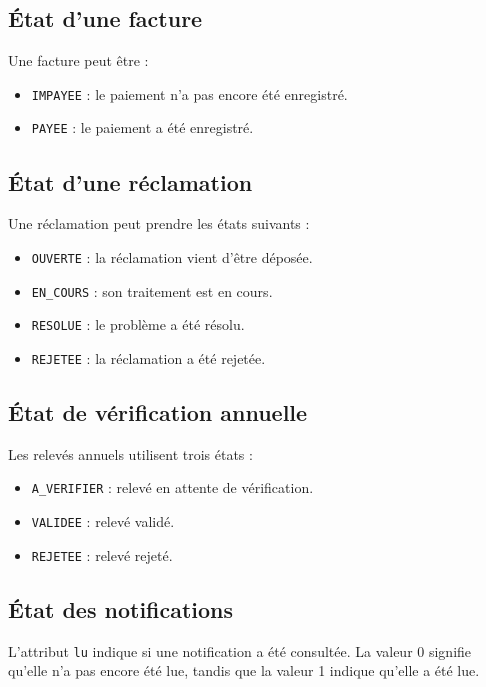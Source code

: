 \subsection*{État d'une facture}

Une facture peut être :

\begin{itemize}[leftmargin=*]
    \item \texttt{IMPAYEE} : le paiement n'a pas encore été enregistré.
    \item \texttt{PAYEE} : le paiement a été enregistré.
\end{itemize}

\subsection*{État d'une réclamation}

Une réclamation peut prendre les états suivants :

\begin{itemize}[leftmargin=*]
    \item \texttt{OUVERTE} : la réclamation vient d'être déposée.
    \item \texttt{EN\_COURS} : son traitement est en cours.
    \item \texttt{RESOLUE} : le problème a été résolu.
    \item \texttt{REJETEE} : la réclamation a été rejetée.
\end{itemize}

\subsection*{État de vérification annuelle}

Les relevés annuels utilisent trois états :

\begin{itemize}[leftmargin=*]
    \item \texttt{A\_VERIFIER} : relevé en attente de vérification.
    \item \texttt{VALIDEE} : relevé validé.
    \item \texttt{REJETEE} : relevé rejeté.
\end{itemize}

\subsection*{État des notifications}

L'attribut \texttt{lu} indique si une notification a été consultée. La valeur 0 signifie qu'elle n'a pas encore été lue, tandis que la valeur 1 indique qu'elle a été lue.

